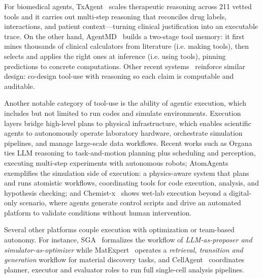For biomedical agents, TxAgent~\cite{gao2025txagentaiagenttherapeutic} scales therapeutic reasoning across 211 vetted tools and it carries out multi-step reasoning that reconciles drug labels, interactions, and patient context—turning clinical justification into an executable trace. On the other hand, AgentMD~\cite{jin2024agentmdempoweringlanguageagents} builds a two-stage tool memory: it first mines thousands of clinical calculators from literature (i.e. making tools), then selects and applies the right ones at inference (i.e. using tools), pinning predictions to concrete computations. Other recent systems~\cite{lála2023paperqaretrievalaugmentedgenerativeagent, skarlinski2024languageagentsachievesuperhuman,chiang2024llamp,zhang2024honeycombflexiblellmbasedagent,qu2025crisprgptagenticautomationgeneediting,gao2025pharmagentsbuildingvirtualpharma} reinforce similar design: co-design tool-use with reasoning so each claim is computable and auditable.



Another notable category of tool-use is the ability of agentic execution, which includes but not limited to run codes and simulate environments. Execution layers bridge high-level plans to physical infrastructure, which enables scientific agents to autonomously operate laboratory hardware, orchestrate simulation pipelines, and manage large-scale data workflows. Recent works such as Organa~\cite{darvish2025organaroboticassistantautomated} ties LLM reasoning to task-and-motion planning plus scheduling and perception, executing multi-step experiments with autonomous robots;  AtomAgents~\cite{ghafarollahi2024atomagentsalloydesigndiscovery} exemplifies the simulation side of execution: a physics-aware system that plans and runs atomistic workflows, coordinating tools for code execution, analysis, and hypothesis checking; and Chemist-x~\cite{chen2025chemistxlargelanguagemodelempowered} shows wet-lab execution beyond a digital-only scenario, where agents generate control scripts and drive an automated platform to validate conditions without human intervention. 

Several other platforms couple execution with optimization or team-based autonomy. For instance, SGA~\cite{ma2024llmsimulationbileveloptimizers} formalizes the workflow of \textit{LLM-as-proposer and simulator-as-optimizer}  while MatExpert~\cite{ding2024matexpertdecomposingmaterialsdiscovery} operates a \textit{retrieval, transition and generation} workflow for material discovery tasks, and CellAgent~\cite{xiao2024cellagentllmdrivenmultiagentframework} coordinates planner, executor and evaluator roles to run full single-cell analysis pipelines. 



